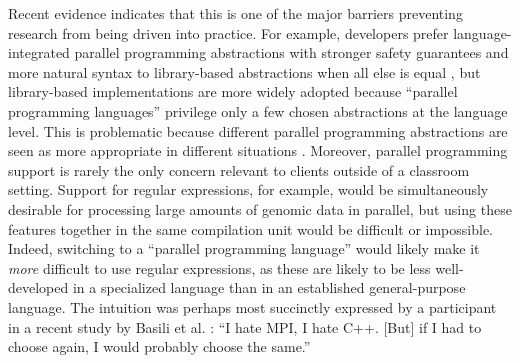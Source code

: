 Recent evidence indicates that this is one of the major barriers preventing research from being driven into practice. For example, developers prefer language-integrated parallel programming abstractions with stronger safety guarantees and more natural syntax to library-based abstractions when all else is equal \cite{cave2010comparing}, but library-based implementations are more widely adopted because ``parallel programming languages'' privilege only a few chosen  abstractions at the language level. This is problematic because different parallel programming abstractions are seen as more appropriate in different situations \cite{Tasharofi:2013rc}. Moreover,  parallel programming support is rarely the only concern relevant to clients outside of a classroom setting. Support for regular expressions, for example, would be simultaneously desirable for processing large amounts of genomic data in parallel, but using these features together in the same compilation unit would be difficult or impossible. Indeed, switching to a ``parallel programming language'' would likely make it \emph{more} difficult to use regular expressions, as these are likely to be less well-developed in a specialized language than in an established general-purpose language. The intuition was perhaps most succinctly expressed by a participant in a recent study by Basili et al. \cite{basili2008understanding}:  ``I hate MPI, I hate C++. [But] if I had to choose again, I would probably choose the same.'' %



